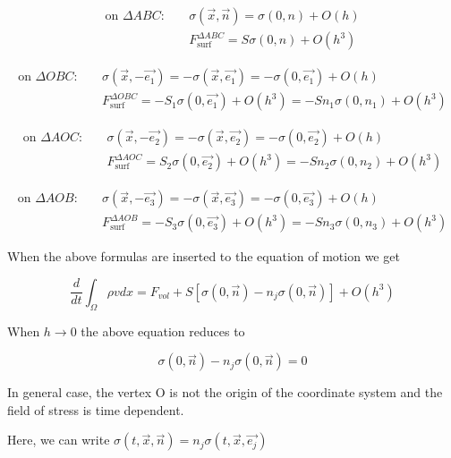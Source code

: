 \documentclass{article}
\begin{document}
{\begin{align*}
\text{on } \Delta ABC: \quad & \sigma(\overrightarrow{x},\overrightarrow{n}) = \sigma(0,n) + O(h)\\
							& F_{\text{surf}}^{\Delta ABC} = S\sigma(0,n) + O(h^{3}) 
\end{align*}

\begin{align*}
\text{on } \Delta OBC: \quad & \sigma(\overrightarrow{x},-\overrightarrow{e_{1}}) = -\sigma(\overrightarrow{x},\overrightarrow{e_{1}})= -\sigma(0,\overrightarrow{e_{1}}) + O(h)\\
							& F_{\text{surf}}^{\Delta OBC} = -S_{1}\sigma(0,\overrightarrow{e_{1}}) + O(h^{3}) = -Sn_{1}\sigma(0,n_{1}) + O(h^{3})
\end{align*}

\begin{align*}
\text{on } \Delta AOC: \quad & \sigma(\overrightarrow{x},-\overrightarrow{e_{2}}) = -\sigma(\overrightarrow{x},\overrightarrow{e_{2}})= -\sigma(0,\overrightarrow{e_{2}}) + O(h)\\
							& F_{\text{surf}}^{\Delta AOC} = S_{2}\sigma(0,\overrightarrow{e_{2}}) + O(h^{3})  = -Sn_{2}\sigma(0,n_{2}) + O(h^{3})
\end{align*}

\begin{align*}
\text{on } \Delta AOB: \quad & \sigma(\overrightarrow{x},-\overrightarrow{e_{3}}) = -\sigma(\overrightarrow{x},\overrightarrow{e_{3}})= -\sigma(0,\overrightarrow{e_{3}}) + O(h)\\
							& F_{\text{surf}}^{\Delta AOB} = -S_{3}\sigma(0,\overrightarrow{e_{3}}) + O(h^{3}) = -Sn_{3}\sigma(0,n_{3}) + O(h^{3})
\end{align*}

When the above formulas are inserted to the equation of motion we get

$$\frac{d}{dt}\int_{\Omega}\rho vdx = F_{vol} + S[\sigma(0,\overrightarrow{n}) - n_{j}\sigma(0,\overrightarrow{n})] + O(h^{3})$$

When $h\to 0$ the above equation reduces to

$$\sigma(0,\overrightarrow{n}) - n_{j}\sigma(0,\overrightarrow{n}) = 0$$

In general case, the vertex O is not the origin of the coordinate system and the field of stress is time dependent.

Here, we can write  $\sigma(t,\overrightarrow{x},\overrightarrow{n}) = n_{j}\sigma(t,\overrightarrow{x},\overrightarrow{e_{j}})$

}
\end{document}
